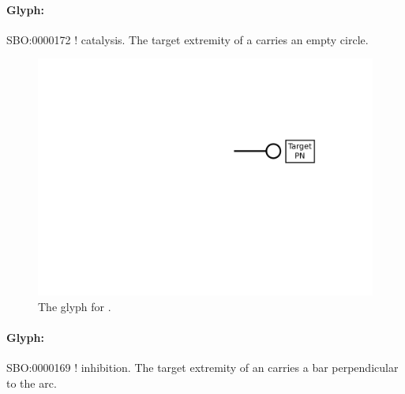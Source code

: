 \paragraph{Glyph: }\label{sec:catalysis}


\begin{glyphDescription}
 \glyphSboTerm SBO:0000172 ! catalysis.
 \glyphNode The target extremity of a  carries an empty circle.
 \end{glyphDescription}

\begin{figure}[H]
  \centering
  \includegraphics[scale = 0.5]{images/catalysis}
  \caption{The \PD glyph for .}
  \label{fig:catalysis}
\end{figure}


\paragraph{Glyph: }\label{sec:inhibition}


\begin{glyphDescription}
 \glyphSboTerm SBO:0000169 ! inhibition.
 \glyphNode The target extremity of an  carries a bar perpendicular to the arc.
 \end{glyphDescription}

